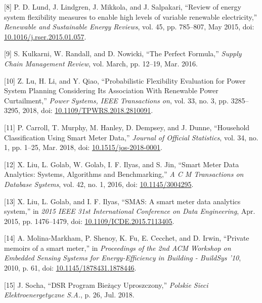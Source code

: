 \begin{cslreferences}
\leavevmode\hypertarget{ref-lund_review_2015}{}%
{[}8{]} P. D. Lund, J. Lindgren, J. Mikkola, and J. Salpakari, ``Review
of energy system flexibility measures to enable high levels of variable
renewable electricity,'' \emph{Renewable and Sustainable Energy
Reviews}, vol. 45, pp. 785--807, May 2015, doi:
\href{https://doi.org/10.1016/j.rser.2015.01.057}{10.1016/j.rser.2015.01.057}.

\leavevmode\hypertarget{ref-kulkarni_perfect_2016}{}%
{[}9{]} S. Kulkarni, W. Randall, and D. Nowicki, ``The Perfect
Formula,'' \emph{Supply Chain Management Review}, vol. March, pp.
12--19, Mar. 2016.

\leavevmode\hypertarget{ref-lu_probabilistic_2018}{}%
{[}10{]} Z. Lu, H. Li, and Y. Qiao, ``Probabilistic Flexibility
Evaluation for Power System Planning Considering Its Association With
Renewable Power Curtailment,'' \emph{Power Systems, IEEE Transactions
on}, vol. 33, no. 3, pp. 3285--3295, 2018, doi:
\href{https://doi.org/10.1109/TPWRS.2018.2810091}{10.1109/TPWRS.2018.2810091}.

\leavevmode\hypertarget{ref-carroll_household_2018}{}%
{[}11{]} P. Carroll, T. Murphy, M. Hanley, D. Dempsey, and J. Dunne,
``Household Classification Using Smart Meter Data,'' \emph{Journal of
Official Statistics}, vol. 34, no. 1, pp. 1--25, Mar. 2018, doi:
\href{https://doi.org/10.1515/jos-2018-0001}{10.1515/jos-2018-0001}.

\leavevmode\hypertarget{ref-liu_smart_2016}{}%
{[}12{]} X. Liu, L. Golab, W. Golab, I. F. Ilyas, and S. Jin, ``Smart
Meter Data Analytics: Systems, Algorithms and Benchmarking,'' \emph{A C
M Transactions on Database Systems}, vol. 42, no. 1, 2016, doi:
\href{https://doi.org/10.1145/3004295}{10.1145/3004295}.

\leavevmode\hypertarget{ref-liu_smas_2015}{}%
{[}13{]} X. Liu, L. Golab, and I. F. Ilyas, ``SMAS: A smart meter data
analytics system,'' in \emph{2015 IEEE 31st International Conference on
Data Engineering}, Apr. 2015, pp. 1476--1479, doi:
\href{https://doi.org/10.1109/ICDE.2015.7113405}{10.1109/ICDE.2015.7113405}.

\leavevmode\hypertarget{ref-molina-markham_private_2010}{}%
{[}14{]} A. Molina-Markham, P. Shenoy, K. Fu, E. Cecchet, and D. Irwin,
``Private memoirs of a smart meter,'' in \emph{Proceedings of the 2nd
ACM Workshop on Embedded Sensing Systems for Energy-Efficiency in
Building - BuildSys '10}, 2010, p. 61, doi:
\href{https://doi.org/10.1145/1878431.1878446}{10.1145/1878431.1878446}.

\leavevmode\hypertarget{ref-socha_dsr_2018}{}%
{[}15{]} J. Socha, ``DSR Program Bieżący Uproszczony,'' \emph{Polskie
Sieci Elektroenergetyczne S.A.}, p. 26, Jul. 2018.


\end{cslreferences}
